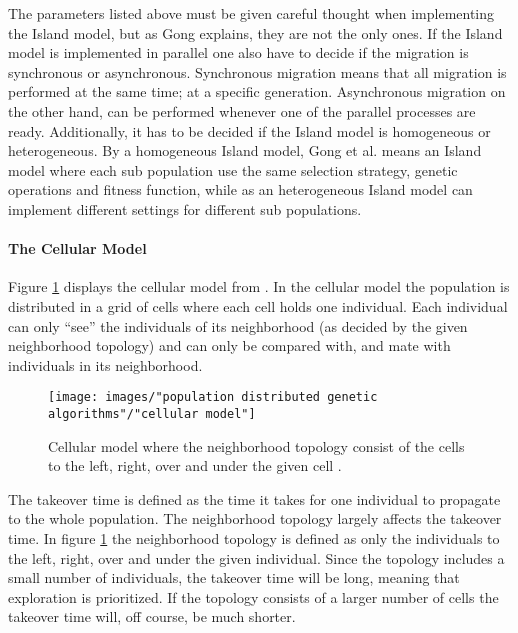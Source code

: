 \noindent The parameters listed above must be given careful thought when implementing the Island model, but as Gong explains, they are not the only ones. If the Island model is implemented in parallel one also have to decide if the migration is synchronous or asynchronous. Synchronous migration means that all migration is performed at the same time; at a specific generation. Asynchronous migration on the other hand, can be performed whenever one of the parallel processes are ready. Additionally, it has to be decided if the Island model is homogeneous or heterogeneous. By a homogeneous Island model, Gong et al. means an Island model where each sub population use the same selection strategy, genetic operations and fitness function, while as an heterogeneous Island model can implement different settings for different sub populations.


\paragraph*{The Cellular Model}
Figure \ref{Cellular model} displays the cellular model from \cite{Gong}. In the cellular model the population is distributed in a grid of cells where each cell holds one individual. Each individual can only ``see'' the individuals of its neighborhood (as decided by the given neighborhood topology) and can only be compared with, and mate with individuals in its neighborhood. \\


\begin{figure}[h!]
\begin{center}
\texttt{[image: images/"population distributed genetic algorithms"/"cellular model"]}
\caption{Cellular model where the neighborhood topology consist of the cells to the left, right, over and under the given cell \citep{Gong}.}
\label{Cellular model}
\end{center}
\end{figure}


\noindent The takeover time is defined as the time it takes for one individual to propagate to the whole population. The neighborhood topology largely affects the takeover time. In figure \ref{Cellular model} the neighborhood topology is defined as only the individuals to the left, right, over and under the given individual. Since the topology includes a small number of individuals, the takeover time will be long, meaning that exploration is prioritized. If the topology consists of a larger number of cells the takeover time will, off course, be much shorter.\\


